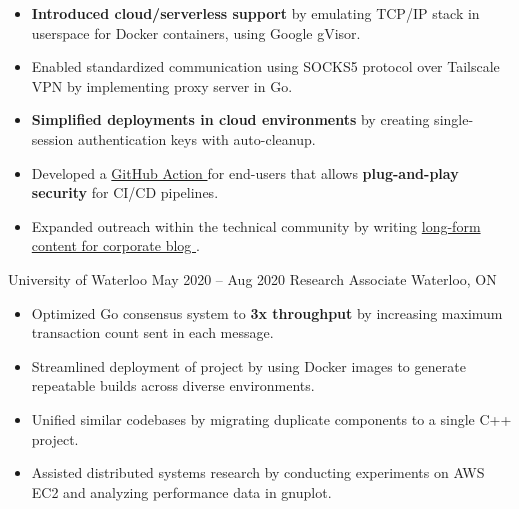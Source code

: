 \documentclass{article}
\begin{document}
  {
    \begin{itemize} \itemsep -1pt
      \item \textbf{Introduced cloud/serverless support} by emulating TCP/IP stack in userspace for Docker containers, using Google gVisor.
      \item Enabled standardized communication using SOCKS5 protocol over Tailscale VPN by implementing proxy server in Go.
      \item \textbf{Simplified deployments in cloud environments} by creating single-session authentication keys with auto-cleanup.
      \item Developed a \href{https://github.com/tailscale/github-action}{GitHub Action \linkIcon} for end-users that allows \textbf{plug-and-play security} for CI/CD pipelines.
      \item Expanded outreach within the technical community by writing \href{https://tailscale.com/blog/2021-05-github-actions-and-tailscale/}{long-form content for corporate blog \linkIcon}.
    \end{itemize}
  }
\WorkEntry
  {University of Waterloo}
  {May 2020 -- Aug 2020}
  {Research Associate \hfill Waterloo, ON}
  {
    \begin{itemize} \itemsep -1pt
      \item Optimized Go consensus system to \textbf{3x throughput} by increasing maximum transaction count sent in each message.
      \item Streamlined deployment of project by using Docker images to generate repeatable builds across diverse environments.
      \item Unified similar codebases by migrating duplicate components to a single  C++ project.
      \item Assisted distributed systems research by conducting experiments on AWS EC2 and analyzing performance data in gnuplot.
    \end{itemize}
  }
\end{document}
